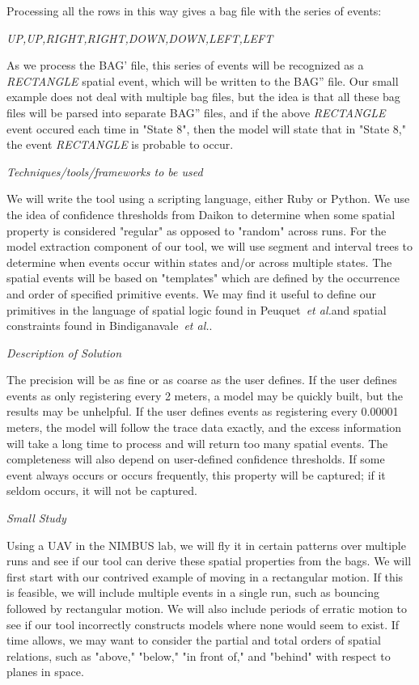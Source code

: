 \documentclass{article}
\newcommand\etal{\emph{et al.}}
\begin{document}
Processing all the rows in this way gives a bag file with the series of events: 

\emph{UP,UP,RIGHT,RIGHT,DOWN,DOWN,LEFT,LEFT}

As we process the BAG' file, this series of events will be recognized as a \emph{RECTANGLE} spatial event, which will be written to the BAG'' file.  
Our small example does not deal with multiple bag files, but the idea is that all these bag files will be parsed into separate BAG'' files, and if the above \emph{RECTANGLE} event occured each time in "State 8", then the model will state that in "State 8," the event \emph{RECTANGLE} is probable to occur.

\emph{Techniques/tools/frameworks to be used}

We will write the tool using a scripting language, either Ruby or Python.
We use the idea of confidence thresholds from Daikon to determine when some spatial property is considered "regular" as opposed to "random" across runs. 
For the model extraction component of our tool, we will use segment and interval trees to determine when events occur within states and/or across multiple states.
The spatial events will be based on "templates" which are defined by the occurrence and order of specified primitive events.
We may find it useful to define our primitives in the language of spatial logic found in Peuquet~\etal and spatial constraints found in Bindiganavale~\etal. 

\emph{Description of Solution}

The precision will be as fine or as coarse as the user defines.
If the user defines events as only registering every 2 meters, a model may be quickly built, but the results may be unhelpful.
If the user defines events as registering every 0.00001 meters, the model will follow the trace data exactly, and the excess information will take a long time to process and will return too many spatial events.
The completeness will also depend on user-defined confidence thresholds.
If some event always occurs or occurs frequently, this property will be captured; if it seldom occurs, it will not be captured.  

\emph{Small Study}

Using a UAV in the NIMBUS lab, we will fly it in certain patterns over multiple runs and see if our tool can derive these spatial properties from the bags.
We will first start with our contrived example of moving in a rectangular motion.  
If this is feasible, we will include multiple events in a single run, such as bouncing followed by rectangular motion.
We will also include periods of erratic motion to see if our tool incorrectly constructs models where none would seem to exist.
If time allows, we may want to consider the partial and total orders of spatial relations, such as "above," "below," "in front of," and "behind" with respect to planes in space.
\end{document}
